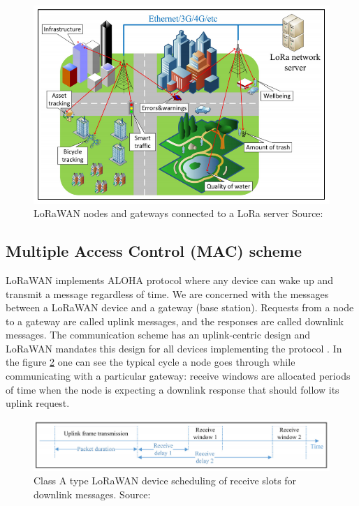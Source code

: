 \begin{figure}[h!]
  \centering
  \includegraphics[scale=0.4]{figures/start-topology.PNG}
  \caption{LoRaWAN nodes and gateways connected to a LoRa server Source: \cite{doppler}}
  \label{fig:star}
\end{figure}

\subsection{Multiple Access Control (MAC) scheme}

LoRaWAN implements ALOHA protocol where any device can wake up and transmit a message regardless of time. We are concerned with the messages between a LoRaWAN device and a gateway (base station). Requests from a node to a gateway are called uplink messages, and the responses are called downlink messages.  
The communication scheme has an uplink-centric design and 
LoRaWAN mandates this design for all devices implementing the protocol \cite{simulator}. In the figure \ref{fig:class A} one can see the typical cycle a node goes through while communicating with a particular gateway: receive windows are allocated periods of time when the node is expecting 
a downlink response that should follow its uplink request.

\begin{figure}[h!]
  \centering
  \includegraphics[scale=0.5]{figures/class A.PNG}
  \caption{Class A type LoRaWAN device scheduling of receive slots for downlink messages. Source: \cite{doppler}}
  \label{fig:class A}
\end{figure}

